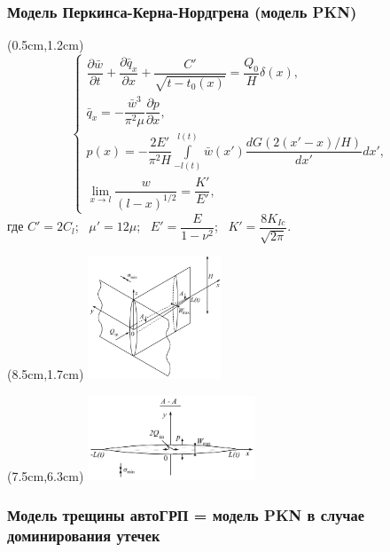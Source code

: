 \documentclass{beamer}
\begin{document}
\begin{frame}
\frametitle{Модель Перкинса-Керна-Нордгрена (модель PKN)}

\begin{textblock*}{7cm}(0.5cm,1.2cm)
$$
\begin{cases}
\dfrac{\partial\bar{w}}{\partial t}+\dfrac{\partial\bar{q}_x}{\partial x}+\dfrac{C'}{\sqrt{t-t_0(x)}}=\dfrac{Q_0}{H}\delta(x),\\[15pt]
\bar{q}_x=-\dfrac{\bar{w}^3}{\pi^2\mu}\dfrac{\partial p}{\partial x},\\[15pt]
p(x)=-\dfrac{2E'}{\pi^2H}\displaystyle\int\limits_{-l(t)}^{l(t)}\bar{w}(x')\dfrac{dG(2(x'-x)/H)}{dx'}dx',\\[22pt]
\displaystyle\lim_{x\to l}\dfrac{w}{(l-x)^{1/2}}=\dfrac{K'}{E'},
\end{cases}
$$
где $C'=2C_l$; $\,\,\,\mu'=12\mu$; $\,\,\,E'=\dfrac{E}{1-\nu^2}$; $\,\,\,K'=\dfrac{8K_{Ic}}{\sqrt{2\pi}}$.
\end{textblock*}

\begin{textblock*}{7cm}(8.5cm,1.7cm)
\includegraphics[width=4cm]{pkn_model_3D.jpg}
\end{textblock*}

\begin{textblock*}{7cm}(7.5cm,6.3cm)
\includegraphics[width=5cm]{pkn_model_A-A_plane.jpg}
\end{textblock*}


\end{frame}

\begin{frame}
\frametitle{Модель трещины автоГРП = модель PKN в случае доминирования утечек}

\end{frame}
\end{document}
